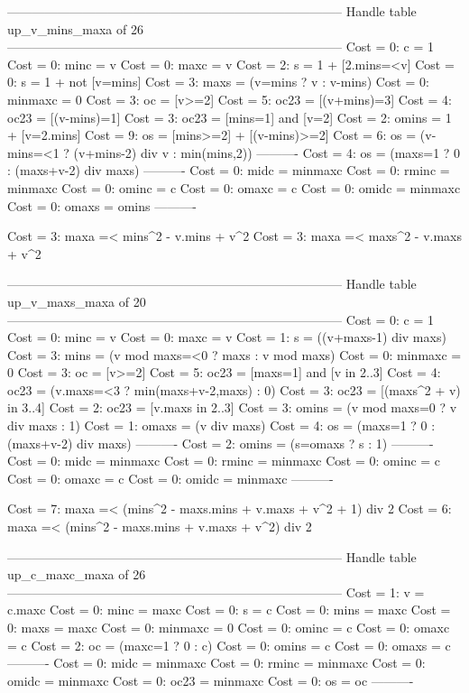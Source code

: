 --------------------------------------------------------------------------------
Handle table up_v_mins_maxa of 26
--------------------------------------------------------------------------------
Cost =  0:  c       = 1
Cost =  0:  minc    = v
Cost =  0:  maxc    = v
Cost =  2:  s       = 1 + [2.mins=<v]
Cost =  0:  s       = 1 + not [v=mins]
Cost =  3:  maxs    = (v=mins ? v : v-mins)
Cost =  0:  minmaxc = 0
Cost =  3:  oc      = [v>=2]
Cost =  5:  oc23    = [(v+mins)=3]
Cost =  4:  oc23    = [(v-mins)=1]
Cost =  3:  oc23    = [mins=1] and [v=2]
Cost =  2:  omins   = 1 + [v=2.mins]
Cost =  9:  os      = [mins>=2] + [(v-mins)>=2]
Cost =  6:  os      = (v-mins=<1 ? (v+mins-2) div v : min(mins,2))
----------
Cost =  4:  os      = (maxs=1 ? 0 : (maxs+v-2) div maxs)
----------
Cost =  0:  midc    = minmaxc
Cost =  0:  rminc   = minmaxc
Cost =  0:  ominc   = c
Cost =  0:  omaxc   = c
Cost =  0:  omidc   = minmaxc
Cost =  0:  omaxs   = omins
----------

Cost =  3:  maxa =< mins^2 - v.mins + v^2
Cost =  3:  maxa =< maxs^2 - v.maxs + v^2

--------------------------------------------------------------------------------
Handle table up_v_maxs_maxa of 20
--------------------------------------------------------------------------------
Cost =  0:  c       = 1
Cost =  0:  minc    = v
Cost =  0:  maxc    = v
Cost =  1:  s       = ((v+maxs-1) div maxs)
Cost =  3:  mins    = (v mod maxs=<0 ? maxs : v mod maxs)
Cost =  0:  minmaxc = 0
Cost =  3:  oc      = [v>=2]
Cost =  5:  oc23    = [maxs=1] and [v in 2..3]
Cost =  4:  oc23    = (v.maxs=<3 ? min(maxs+v-2,maxs) : 0)
Cost =  3:  oc23    = [(maxs^2 + v) in 3..4]
Cost =  2:  oc23    = [v.maxs in 2..3]
Cost =  3:  omins   = (v mod maxs=0 ? v div maxs : 1)
Cost =  1:  omaxs   = (v div maxs)
Cost =  4:  os      = (maxs=1 ? 0 : (maxs+v-2) div maxs)
----------
Cost =  2:  omins   = (s=omaxs ? s : 1)
----------
Cost =  0:  midc    = minmaxc
Cost =  0:  rminc   = minmaxc
Cost =  0:  ominc   = c
Cost =  0:  omaxc   = c
Cost =  0:  omidc   = minmaxc
----------

Cost =  7:  maxa =< (mins^2 - maxs.mins + v.maxs + v^2 + 1) div 2
Cost =  6:  maxa =< (mins^2 - maxs.mins + v.maxs + v^2) div 2

--------------------------------------------------------------------------------
Handle table up_c_maxc_maxa of 26
--------------------------------------------------------------------------------
Cost =  1:  v       = c.maxc
Cost =  0:  minc    = maxc
Cost =  0:  s       = c
Cost =  0:  mins    = maxc
Cost =  0:  maxs    = maxc
Cost =  0:  minmaxc = 0
Cost =  0:  ominc   = c
Cost =  0:  omaxc   = c
Cost =  2:  oc      = (maxc=1 ? 0 : c)
Cost =  0:  omins   = c
Cost =  0:  omaxs   = c
----------
Cost =  0:  midc    = minmaxc
Cost =  0:  rminc   = minmaxc
Cost =  0:  omidc   = minmaxc
Cost =  0:  oc23    = minmaxc
Cost =  0:  os      = oc
----------

